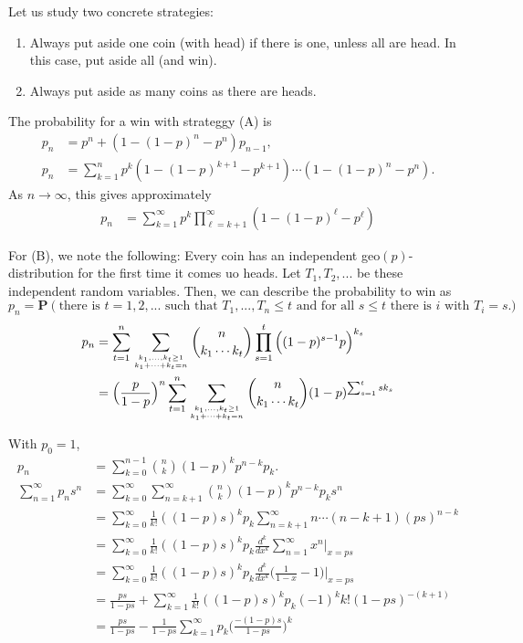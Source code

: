 \documentclass{article}
\theoremstyle{definition}
\theoremstyle{step} \newtheorem{step}{Step}
\begin{document}
Let us study two concrete strategies:
\begin{enumerate}
  \item[(A)] Always put aside one coin (with head) if there is one,
    unless all are head. In this case, put aside all (and win).
  \item[(B)] Always put aside as many coins as there are heads.
\end{enumerate}
The probability for a win with strateggy (A) is
\begin{align*}
  p_n & = p^n + (1 - (1-p)^n - p^n)p_{n-1}, \\ p_n & = \sum_{k=1}^n
  p^k (1 - (1-p)^{k+1} - p^{k+1}) \cdots (1 - (1-p)^n - p^n).
\end{align*}
As $n\to\infty$, this gives approximately
\begin{align*}
  p_n & = \sum_{k=1}^\infty p^k \prod_{\ell = k+1}^\infty (1 -
  (1-p)^\ell - p^\ell)
\end{align*}

\newpage

For (B), we note the following: Every coin has an independent
geo$(p)$-distribution for the first time it comes uo heads. Let $T_1,
T_2,...$ be these independent random variables. Then, we can describe
the probability to win as
$$ p_n = \mathbf P(\text{there is $t=1,2,...$ such that $T_1,...,T_n
  \leq t$ and for all $s\leq t$ there is $i$ with $T_i=s$}).$$
\begin{align*}
  p_n & = \sum_{t=1}^n \sum_{k_1,...,k_t \geq 1 \atop k_1 + \cdots + k_t
    = n} \binom{n}{k_1 \cdots k_t} \prod_{s=1}^t \Big((1-p)^{s-1}p\Big)^{k_s}
  \\ & = \Big( \frac{p}{1-p}\Big)^n \sum_{t=1}^n \sum_{k_1,...,k_t \geq 1 \atop k_1 + \cdots + k_t
    = n} \binom{n}{k_1 \cdots k_t} (1-p)^{\sum_{s=1}^t s k_s}
\end{align*}



With $p_0=1$, 
\begin{align*}
  p_n & = \sum_{k=0}^{n-1} \binom n k (1-p)^k p^{n-k}
  p_k.\\ \sum_{n=1}^\infty p_ns^n & = \sum_{k=0}^\infty
  \sum_{n=k+1}^\infty \binom n k (1-p)^kp^{n-k} p_k s^n \\ & =
  \sum_{k=0}^\infty \frac{1}{k!} ((1-p)s)^k p_k \sum_{n=k+1}^\infty
  n\cdots (n-k+1) (ps)^{n-k} \\ & = \sum_{k=0}^\infty \frac{1}{k!}
  ((1-p)s)^k p_k \frac{d^k}{dx^k} \sum_{n=1}^\infty x^n \Big|_{x = ps}
  \\ & = \sum_{k=0}^\infty \frac{1}{k!} ((1-p)s)^k p_k \frac{d^k}{dx^k}
  \Big( \frac{1}{1-x} - 1\Big) \Big|_{x = ps} \\ & = \frac{ps}{1-ps} +
  \sum_{k=1}^\infty \frac{1}{k!} ((1-p)s)^k p_k (-1)^k k! (1-ps)^{-(k+1)}
  \\ & = \frac{ps}{1-ps} - \frac{1}{1-ps} \sum_{k=1}^\infty
  p_k \Big(\frac{-(1-p)s}{1 - ps}\Big)^k
\end{align*}
\end{document}
